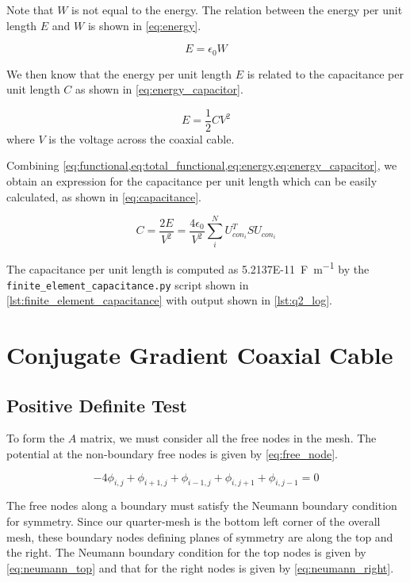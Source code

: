 \documentclass[a4paper,titlepage]{article}
\begin{document}
	Note that $W$ is not equal to the energy. The relation between the energy per unit length $E$ and $W$ is shown in \cref{eq:energy}.
	
	\begin{equation} \label{eq:energy}
		E = \epsilon_0 W
	\end{equation}
	
	We then know that the energy per unit length $E$ is related to the capacitance per unit length $C$ as shown in \cref{eq:energy_capacitor}.
	
	\begin{equation} \label{eq:energy_capacitor}
		E = \frac{1}{2} C V^2
	\end{equation}
	where $V$ is the voltage across the coaxial cable.
	
	Combining \cref{eq:functional,eq:total_functional,eq:energy,eq:energy_capacitor}, we obtain an expression for the capacitance per unit length which can be easily calculated, as shown in \autoref{eq:capacitance}.
	
	\begin{equation} \label{eq:capacitance}
		C = \frac{2E}{V^2} = \frac{4 \epsilon_0}{V^2} \sum_{i}^{N}{U_{con_i}^T S U_{con_i}}
	\end{equation}
	
	The capacitance per unit length is computed as \SI{5.2137E-11}{\farad\per\meter} by the \texttt{finite_element_capacitance.py} script shown in \cref{lst:finite_element_capacitance} with output shown in \cref{lst:q2_log}.
	
	\section{Conjugate Gradient Coaxial Cable}
	
	\subsection{Positive Definite Test}
	
	To form the $A$ matrix, we must consider all the free nodes in the mesh. The potential at the non-boundary free nodes is given by \cref{eq:free_node}.
	
	\begin{equation} \label{eq:free_node}
		-4\phi_{i, j} + \phi_{i + 1, j}  + \phi_{i - 1, j}  + \phi_{i, j + 1}  + \phi_{i, j - 1} = 0
	\end{equation}
	
	The free nodes along a boundary must satisfy the Neumann boundary condition for symmetry. Since our quarter-mesh is the bottom left corner of the overall mesh, these boundary nodes defining planes of symmetry are along the top and the right. The Neumann boundary condition for the top nodes is given by \cref{eq:neumann_top} and that for the right nodes is given by \cref{eq:neumann_right}.
\end{document}

